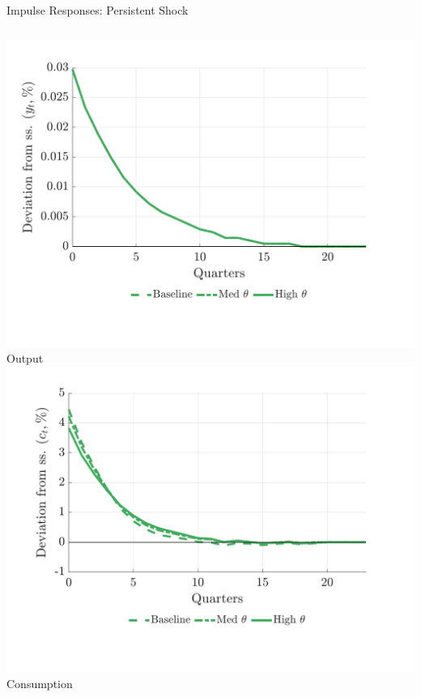 \documentclass[aspectratio=169,11pt,professionalfonts]{beamer}
\newcommand{\1}{\mathbb{1}}
\begin{document}
\begin{frame}{Impulse Responses: Persistent Shock}
  \begin{columns}[T,onlytextwidth]
    \includegraphics[width=\linewidth]{../../pro-default-model/results/comparison_figure_17.pdf}\\[-0.5em]
    {\scriptsize Output}
    \includegraphics[width=\linewidth]{../../pro-default-model/results/comparison_figure_19.pdf}\\[-0.5em]
    {\scriptsize Consumption}

\end{columns}
\end{frame}
\end{document}
